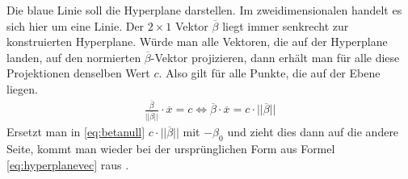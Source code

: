 \documentclass[
]{article}
\begin{document}
Die blaue Linie soll die Hyperplane darstellen. Im zweidimensionalen
handelt es sich hier um eine Linie. Der \(2 \times 1\) Vektor
\(\overline{\beta}\) liegt immer senkrecht zur konstruierten Hyperplane.
Würde man alle Vektoren, die auf der Hyperplane landen, auf den
normierten \(\overline{\beta}\)-Vektor projizieren, dann erhält man für
alle diese Projektionen denselben Wert \(c\). Also gilt für alle Punkte,
die auf der Ebene liegen. \begin{align}
\frac{\overline \beta}{||\overline{\beta}||}\cdot \overline{x}=c \Leftrightarrow \overline{\beta}\cdot \overline{x}=c \cdot ||\overline{\beta}||\label{eq:betanull}
\end{align} Ersetzt man in \eqref{eq:betanull}
\(c \cdot ||\overline{\beta}||\) mit \(-\beta_0\) und zieht dies dann
auf die andere Seite, kommt man wieder bei der ursprünglichen Form aus
Formel \eqref{eq:hyperplanevec} raus
\parencite{mavroforakisGeometricApproachSupport2006}.
\end{document}
